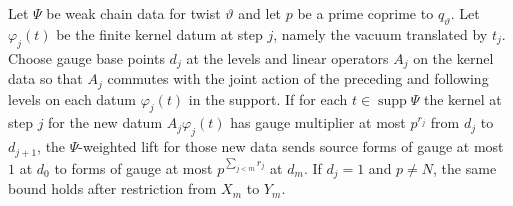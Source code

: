 \begin{lemma}
\label{lem:a-weak-chain-gauge}
\emitthmsource
Let $\Psi$ be weak chain data for twist $\vartheta$ and let $p$ be a prime coprime to $q_\vartheta$. Let $\varphi_j(t)$ be the finite kernel datum at step $j$, namely the vacuum translated by $t_j$. Choose gauge base points $d_j$ at the levels and linear operators $A_j$ on the kernel data so that $A_j$ commutes with the joint action of the preceding and following levels on each datum $\varphi_j(t)$ in the support. If for each $t\in\operatorname{supp}\Psi$ the kernel at step $j$ for the new datum $A_j\varphi_j(t)$ has gauge multiplier at most $p^{r_j}$ from $d_j$ to $d_{j+1}$, the $\Psi$-weighted lift for those new data sends source forms of gauge at most $1$ at $d_0$ to forms of gauge at most $p^{\sum_{j<m}r_j}$ at $d_m$. If $d_j=1$ and $p\ne N$, the same bound holds after restriction from $X_m$ to $Y_m$.
\end{lemma}
